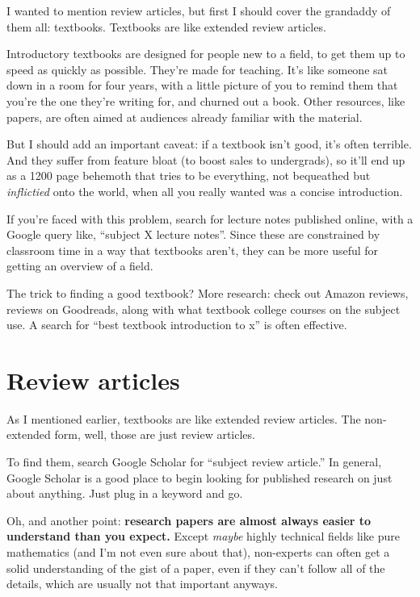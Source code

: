 I wanted to mention review articles, but first I should cover the grandaddy of
them all: textbooks. Textbooks are like extended review articles.

Introductory textbooks are designed for people new to a field, to get them up to
speed as quickly as possible. They're made for teaching. It's like someone sat
down in a room for four years, with a little picture of you to remind them that
you're the one they're writing for, and churned out a book. Other resources, like
papers, are often aimed at audiences already familiar with the
material.

But I should add an important caveat: if a textbook isn't good, it's often terrible. And
they suffer from feature bloat (to boost sales to undergrads), so it'll end up
as a 1200 page
behemoth that tries to be everything, not bequeathed but \textit{inflictied} onto the world, when all you really wanted was a concise
introduction.

If you're faced with this problem, search for lecture notes published
online, with a Google query like, ``subject X lecture notes''. Since these are constrained by classroom time in a way that textbooks
aren't, they can be more useful for getting an overview of a field.

The trick to finding a good textbook? More research: check out
Amazon reviews, reviews on Goodreads, along with what textbook college courses on the
subject use. A search for ``best textbook introduction to x'' is often
effective.

\section{Review articles}

As I mentioned earlier, textbooks are like extended review articles. The
non-extended form, well, those are just review articles.

To find them, search Google Scholar for ``subject review article.'' In general,
Google Scholar is a good place to begin looking for published research on just
about anything. Just plug in a keyword and go.

Oh, and another point: \textbf{research papers are almost always easier to
  understand than you expect.} Except \textit{maybe} highly technical fields like
pure mathematics (and I'm not even sure about that), non-experts can often get a
solid understanding of the gist of a paper, even if they can't follow all of the
details, which are usually not that important anyways.

